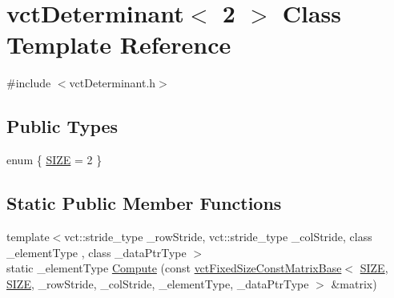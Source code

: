 \hypertarget{classvct_determinant_3_012_01_4}{}\section{vct\+Determinant$<$ 2 $>$ Class Template Reference}
\label{classvct_determinant_3_012_01_4}


{\ttfamily \#include $<$vct\+Determinant.\+h$>$}

\subsection*{Public Types}
\begin{DoxyCompactItemize}
\item 
enum \{ \hyperlink{classvct_determinant_3_012_01_4_a9ed8f323cd2bc515f76a07c1eb7d7544aa4cda1b4da18f6d4c50329a98c60b934}{S\+I\+Z\+E} = 2
 \}
\end{DoxyCompactItemize}
\subsection*{Static Public Member Functions}
\begin{DoxyCompactItemize}
\item 
{\footnotesize template$<$vct\+::stride\+\_\+type \+\_\+row\+Stride, vct\+::stride\+\_\+type \+\_\+col\+Stride, class \+\_\+element\+Type , class \+\_\+data\+Ptr\+Type $>$ }\\static \+\_\+element\+Type \hyperlink{classvct_determinant_3_012_01_4_a2227410e9681c9649b728671fd9babbf}{Compute} (const \hyperlink{classvct_fixed_size_const_matrix_base}{vct\+Fixed\+Size\+Const\+Matrix\+Base}$<$ \hyperlink{classvct_determinant_3_012_01_4_a9ed8f323cd2bc515f76a07c1eb7d7544aa4cda1b4da18f6d4c50329a98c60b934}{S\+I\+Z\+E}, \hyperlink{classvct_determinant_3_012_01_4_a9ed8f323cd2bc515f76a07c1eb7d7544aa4cda1b4da18f6d4c50329a98c60b934}{S\+I\+Z\+E}, \+\_\+row\+Stride, \+\_\+col\+Stride, \+\_\+element\+Type, \+\_\+data\+Ptr\+Type $>$ \&matrix)
\end{DoxyCompactItemize}


